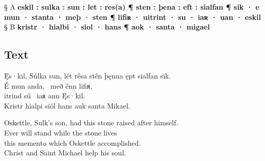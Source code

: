 § A \textbf{eskil : sulka : sun : let : res(a) ¶ sten : þena : eft : sialfan ¶ sik · e mun · stanta · meþ · sten ¶ lifiʀ · uitrint · su · iaʀ · uan · eskil} \\
§ B \textbf{kristr · hialbi · siol · hans ¶ aok · santa · migael}

\subsection{Text}

\bpg\bpa[0]%
\startsub Ę̇s·kil, Súlka sun, lét rêsa stên þęnna ępt sialfan sik.\endsub \\
É mun anda, \hld\ með ênn lifiʀ, \\
itrind sú \hld\ iaʀ ann Ę̇s·kil. \\
Kristr hialpi siól hans auk santa Mikael.\epa

\bpb Oskettle, Sulk’s son, had this stone raised after himself. \\
Ever will stand while the stone lives \\
this memento which Oskettle accomplished. \\
Christ and Saint Michael help his soul.\epb\epg

\sectionline

